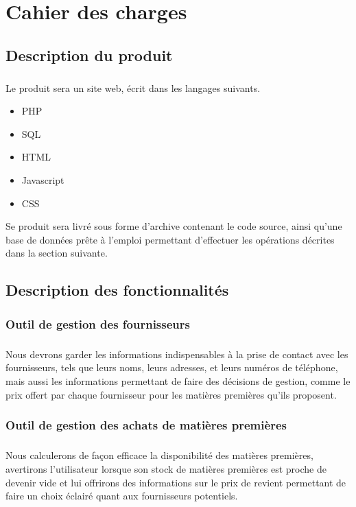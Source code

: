 \chapter{Cahier des charges}

\section{Description du produit}
    \paragraph{}
        Le produit sera un site web, écrit dans les langages suivants.
        \begin{itemize}
            \item PHP
            \item SQL
            \item HTML
            \item Javascript
            \item CSS
        \end{itemize}
        Se produit sera livré sous forme d'archive contenant le code source,
        ainsi qu’une base de données prête à l’emploi permettant d'effectuer
        les opérations décrites dans la section suivante.

\section{Description des fonctionnalités}
    \subsection{Outil de gestion des fournisseurs}
        \paragraph{}
            Nous devrons garder les informations indispensables à la prise de
            contact avec les fournisseurs, tels que leurs noms, leurs adresses,
            et leurs numéros de téléphone, mais aussi les informations
            permettant de faire des décisions de gestion, comme le prix offert
            par chaque fournisseur pour les matières premières qu'ils proposent.
    \subsection{Outil de gestion des achats de matières premières}
        \paragraph{}
            Nous calculerons de façon efficace la disponibilité des matières
            premières, avertirons l'utilisateur lorsque son stock de matières
            premières est proche de devenir vide et lui offrirons  des
            informations sur le prix de revient permettant de faire un choix
            éclairé quant aux fournisseurs potentiels.
